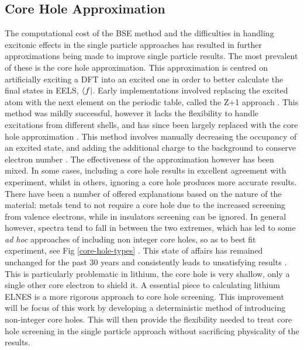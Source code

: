 \subsection{Core Hole Approximation} \label{Core Hole Approximation}
The computational cost of the BSE method and the difficulties in handling excitonic effects in the single particle approaches has resulted in further approximations being made to improve single particle results.  The most prevalent of these is the core hole approximation.  This approximation is centred on artificially exciting a DFT into an excited one in order to better calculate the final states in EELS, $\bra{f}$.  Early implementations involved replacing the excited atom with the next element on the periodic table, called the Z+1 approach \cite{lee_new_1977}.  This method was mildly successful, however it lacks the flexibility to handle excitations from different shells, and has since been largely replaced with the core hole approximation \cite{hebert_practical_2007}.  This method involves manually decreasing the occupancy of an excited state, and adding the additional charge to the background to conserve electron number \cite{wien2k}. The effectiveness of the approximation however has been mixed.  In some cases, including a core hole results in excellent agreement with experiment, whilst in others, ignoring a core hole produces more accurate results.  There have been a number of offered explanations based on the nature of the material: metals tend to not require a core hole due to the increased screening from valence electrons, while in insulators screening can be ignored. In general however, spectra tend to fall in between the two extremes, which has led to some \textit{ad hoc} approaches of including non integer core holes, so as to best fit experiment, see Fig \ref{core-hole-types} \cite{hebert_practical_2007, luitz_partial_2001, hebert_improvement_2003}. This state of affairs has remained unchanged for the past 30 years and consistently leads to unsatisfying results \cite{ brydson_further_1988, hardcastle_robust_2017,bad_hole1,bad_hole2, bad_hole3, bad_hole4, bad_hole5, bad_hole6, bad_hole7, bad_hole8,bad_hole9, bad_hole10}.  This is particularly problematic in lithium, the core hole is very shallow, only a single other core electron to shield it.  A essential piece to calculating lithium ELNES is a more rigorous approach to core hole screening.  This improvement will be focus of this work by developing a deterministic method of introducing non-integer core holes. This will then provide the flexibility needed to treat core hole screening in the single particle approach without sacrificing physicality of the results.


